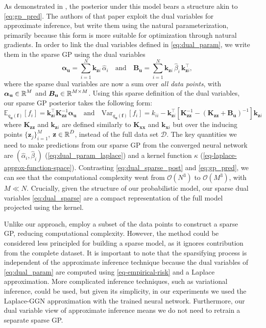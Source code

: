 \documentclass{article}
\newcommand{\dataset}{\ensuremath{\mathcal{D}}}
\newcommand{\mathbold}[1]{\bm{#1}}
\newcommand{\mbf}[1]{\mathbf{#1}}
\newcommand{\T}{\top}
\newcommand{\valpha}[0]{\mathbold{\alpha}}
\newcommand{\MBeta}[0]{\mathbold{B}}
\newcommand{\vz}{\mbf{z}}
\newcommand{\vf}{\mbf{f}}
\newcommand{\vu}{\mbf{u}}
\newcommand{\vx}{\mbf{x}}
\newcommand{\MKzz}{\mbf{K}_{\mbf{z}\mbf{z}}}
\newcommand{\MKxx}{\mbf{K}_{\mbf{x}\mbf{x}}}
\newcommand{\vkzi}{\mbf{k}_{\mbf{z}i}}
\newcommand{\vkzs}{\mbf{k}_{\mbf{z}i}}
\newcommand{\vk}{\mbf{k}}
\newcommand{\myexpect}{\mathbb{E}}
\begin{document}
As demonstrated in \cite{adam2021dual}, the posterior under this model bears a structure akin to \cref{eq:gp_pred}. The authors of that paper exploit the dual variables for approximate inference, but write them using the natural parameterization, primarily because this form is more suitable for optimization through natural gradients. In order to link the dual variables defined in \cref{eq:dual_param}, we write them in the sparse GP using the dual variables
%
\begin{equation} \textstyle
  \valpha_{\vu}  =  \sum_{i=1}^N  \vkzi \, \hat{\alpha}_{i}
  \quad \text{and} \quad
  \MBeta_{\vu} =  \sum_{i=1}^N \vkzi \,\hat{\beta}_{i} \, \vkzi^{\T} ,    
\label{eq:dual_sparse}
\end{equation}
%
where the sparse dual variables are now a sum over \emph{all data points}, with $\valpha_{\vu} \in \R^{M}$ and $\MBeta_{\vu} \in \R^{M  \times M}$. Using this sparse definition of the dual variables, our sparse GP posterior takes the following form:
\begin{equation}\label{eq:dual_sparse_post}
   \myexpect_{q_{\vu}(\vf)}[f_i] = \vkzs^{\T} \MKzz^{-1} \valpha_{\vu}
   \quad \text{and} \quad 
   \textrm{Var}_{q_{\vu}(\vf)}[f_i]  = k_{ii} - \vkzs^\top [\MKzz^{-1} - (\MKzz + \MBeta_{\vu})^{-1} ]\vkzs
\end{equation}
where $\MKzz$ and $\vkzs$ are defined similarly to $\MKxx$ and $\vk_{\vx i}$ but over the inducing points $\{\vz_j\}_{i=1}^M$, $\vz \in \R^{D}$, instead of the full data set $\dataset$. The key quantities we need to make predictions from our sparse GP from the converged neural network are $(\hat{\alpha}_i, \hat{\beta}_i)$ (\cref{eq:dual_param_laplace}) and a kernel function $\kappa$ (\cref{eq-laplace-approx-function-space}). Contrasting \cref{eq:dual_sparse_post} and \cref{eq:gp_pred}, we can see that the computational complexity went from $\mathcal{O}(N^3)$ to $\mathcal{O}(M^3)$, with $M \ll N$.  Crucially, given the structure of our probabilistic model, our sparse dual variables \cref{eq:dual_sparse} are a compact representation of the full model projected using the kernel. 

Unlike our approach, \citet{immer2021improving} employ a subset of the data points to construct a sparse GP, reducing computational complexity. However, the method could be considered less principled for building a sparse model, as it ignores contribution from the complete dataset. It is important to note that the sparsifying process is independent of the approximate inference technique because the dual variables of \cref{eq:dual_param} are computed using \cref{eq-empirical-risk} and a Laplace approximation. More complicated inference techniques, such as variational inference, could be used, but given its simplicity, in our experiments we used the Laplace-GGN approximation with the trained neural network. Furthermore, our dual variable view of approximate inference means we do not need to retrain a separate sparse GP.
\end{document}
